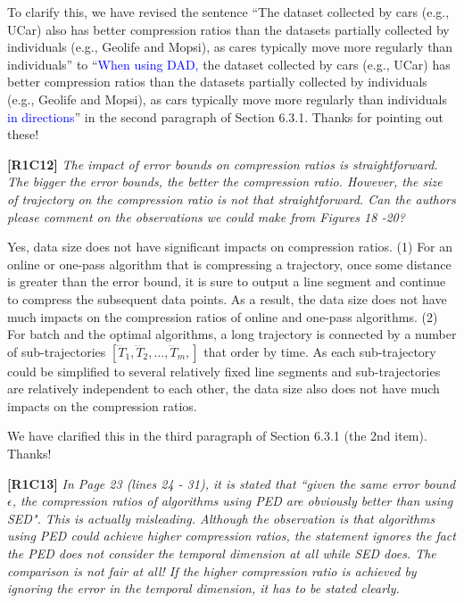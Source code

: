 \documentclass{letter}
\begin{document}
To clarify this, we have revised the sentence ``The dataset collected by cars (e.g., UCar) also has better compression ratios than the datasets partially collected by individuals (e.g., Geolife and Mopsi), as cares typically move more regularly than individuals'' to ``\textcolor{blue}{When using DAD,} the dataset collected by cars (e.g., UCar) has better compression ratios than the datasets partially collected by individuals (e.g., Geolife and Mopsi), as cars typically move more regularly than individuals \textcolor{blue}{in directions}'' in the second paragraph of Section 6.3.1.
Thanks for pointing out these!


\textbf{[R1C12]} \emph{The impact of error bounds on compression ratios is straightforward. The bigger the error bounds, the better the compression ratio. However, the size of trajectory on the compression ratio is not that straightforward. Can the authors please comment on the observations we could make from Figures 18 -20? }

Yes, data size does not have significant impacts on compression ratios. (1) For an online or one-pass algorithm that is compressing a trajectory, once some distance is greater than the error bound, it is sure to output a line segment and continue to compress the subsequent data points. As a result, the data size does not have much impacts on the compression ratios of online and one-pass algorithms.
(2) For batch and the optimal algorithms, a long trajectory is connected by a number of sub-trajectories $[\dddot{T}_1,\dddot{T}_2,..., \dddot{T}_m, ]$ that order by time. As each sub-trajectory could be simplified to several relatively fixed line segments and sub-trajectories are relatively independent to each other, the data size also does not have much impacts on the compression ratios.



We have clarified this in the third paragraph of Section 6.3.1 (the 2{nd} item). Thanks!



\textbf{[R1C13]} \emph{ In Page 23 (lines 24 - 31), it is stated that ``given the same error bound $\epsilon$, the compression ratios of algorithms using PED are obviously better than using SED". This is actually misleading. Although the observation is that algorithms using PED could achieve higher compression ratios, the statement ignores the fact the PED does not consider the temporal dimension at all while SED does. The comparison is not fair at all! If the higher compression ratio is achieved by ignoring the error in the temporal dimension, it has to be stated clearly.}
\end{document}
